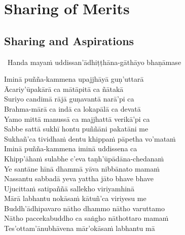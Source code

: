 
\ifdigitalversion
\else
\fi

\chapter{Sharing of Merits}



\begingroup
\setsechook{%
  \clearpage%
  \setsecnumformat{}%
}

\setsecheadstyle{\sectionFmt}

\section{Sharing and Aspirations}
\label{uddissanadhitthana}

\begin{leader}
  \anglebracketleft\ \hspace{-0.5mm}Handa mayaṁ uddissan'ādhiṭṭhāna-gāthāyo bhaṇāmase \hspace{-0.5mm}\anglebracketright\
\end{leader}

Iminā puñña-kammena upajjhāyā guṇ'uttarā\\
Ācariy'ūpakārā ca mātāpitā ca ñātakā\\
Suriyo candimā rājā guṇavantā narā'pi ca\\
Brahma-mārā ca indā ca lokapālā ca devatā\\
Yamo mittā manussā ca majjhattā verikā'pi ca\\
Sabbe sattā sukhī hontu puññāni pakatāni me\\
Sukhañ'ca tividhaṁ dentu khippaṁ pāpetha vo'mataṁ\\
Iminā puñña-kammena iminā uddissena ca\\
Khipp'āhaṁ sulabhe c'eva taṇh'ūpādāna-chedanaṁ\\
Ye santāne hīnā dhammā yāva nibbānato mamaṁ\\
Nassantu sabbadā yeva yattha jāto bhave bhave\\
Ujucittaṁ satipaññā sallekho viriyamhinā\\
Mārā labhantu nokāsaṁ kātuñ'ca viriyesu me\\
Buddh'ādhipavaro nātho dhammo nātho varuttamo\\
Nātho paccekabuddho ca saṅgho nāthottaro mamaṁ\\
Tes'ottam'ānubhāvena mār'okāsaṁ labhantu mā

